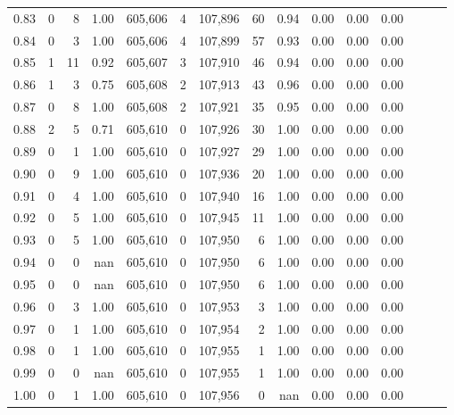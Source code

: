 \begin{tabular}{rrrrrrrrrrrrrrr}
0.83 &       0 &      8 &  1.00 &  605,606 &        4 &  107,896 &       60 &  0.94 &  0.00 &  0.00 &      0.00 \\
0.84 &       0 &      3 &  1.00 &  605,606 &        4 &  107,899 &       57 &  0.93 &  0.00 &  0.00 &      0.00 \\
0.85 &       1 &     11 &  0.92 &  605,607 &        3 &  107,910 &       46 &  0.94 &  0.00 &  0.00 &      0.00 \\
0.86 &       1 &      3 &  0.75 &  605,608 &        2 &  107,913 &       43 &  0.96 &  0.00 &  0.00 &      0.00 \\
0.87 &       0 &      8 &  1.00 &  605,608 &        2 &  107,921 &       35 &  0.95 &  0.00 &  0.00 &      0.00 \\
0.88 &       2 &      5 &  0.71 &  605,610 &        0 &  107,926 &       30 &  1.00 &  0.00 &  0.00 &      0.00 \\
0.89 &       0 &      1 &  1.00 &  605,610 &        0 &  107,927 &       29 &  1.00 &  0.00 &  0.00 &      0.00 \\
0.90 &       0 &      9 &  1.00 &  605,610 &        0 &  107,936 &       20 &  1.00 &  0.00 &  0.00 &      0.00 \\
0.91 &       0 &      4 &  1.00 &  605,610 &        0 &  107,940 &       16 &  1.00 &  0.00 &  0.00 &      0.00 \\
0.92 &       0 &      5 &  1.00 &  605,610 &        0 &  107,945 &       11 &  1.00 &  0.00 &  0.00 &      0.00 \\
0.93 &       0 &      5 &  1.00 &  605,610 &        0 &  107,950 &        6 &  1.00 &  0.00 &  0.00 &      0.00 \\
0.94 &       0 &      0 &   nan &  605,610 &        0 &  107,950 &        6 &  1.00 &  0.00 &  0.00 &      0.00 \\
0.95 &       0 &      0 &   nan &  605,610 &        0 &  107,950 &        6 &  1.00 &  0.00 &  0.00 &      0.00 \\
0.96 &       0 &      3 &  1.00 &  605,610 &        0 &  107,953 &        3 &  1.00 &  0.00 &  0.00 &      0.00 \\
0.97 &       0 &      1 &  1.00 &  605,610 &        0 &  107,954 &        2 &  1.00 &  0.00 &  0.00 &      0.00 \\
0.98 &       0 &      1 &  1.00 &  605,610 &        0 &  107,955 &        1 &  1.00 &  0.00 &  0.00 &      0.00 \\
0.99 &       0 &      0 &   nan &  605,610 &        0 &  107,955 &        1 &  1.00 &  0.00 &  0.00 &      0.00 \\
1.00 &       0 &      1 &  1.00 &  605,610 &        0 &  107,956 &        0 &   nan &  0.00 &  0.00 &      0.00 \\
\bottomrule
\end{tabular}
